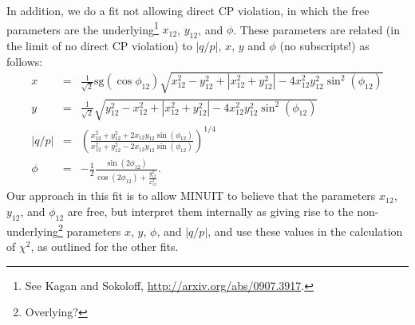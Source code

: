 In addition, we do a fit not allowing direct CP violation, in which the
free parameters are the underlying\footnote{See Kagan and Sokoloff, \url{http://arxiv.org/abs/0907.3917}.}
$x_{12}$, $y_{12}$, and $\phi$. These parameters are related
(in the limit of no direct CP violation) to $|q/p|$, $x$, $y$ and $\phi$ (no subscripts!) as follows:
\begin{eqnarray}
x &=& \frac{1}{\sqrt{2}}\mathrm{sg}(\cos\phi_{12})
\sqrt{x_{12}^2 - y_{12}^2 + |x_{12}^2+y_{12}^2| - 4x_{12}^2y_{12}^2\sin^2(\phi_{12})} \\
%
y &=& \frac{1}{\sqrt{2}}
\sqrt{y_{12}^2 - x_{12}^2 + |x_{12}^2+y_{12}^2| - 4x_{12}^2y_{12}^2\sin^2(\phi_{12})} \\
%
|q/p| &=& \left(\frac{x_{12}^2+y_{12}^2+2x_{12}y_{12}\sin(\phi_{12})}
{x_{12}^2+y_{12}^2-2x_{12}y_{12}\sin(\phi_{12})}\right)^{1/4}\\
%
\phi &=& -\frac{1}{2}\frac{\sin(2\phi_{12})}{\cos(2\phi_{12})+\frac{y_{12}^2}{x_{12}^2}}.
\end{eqnarray}
Our approach in this fit is to allow MINUIT to believe that the parameters $x_{12}$, $y_{12}$,
and $\phi_{12}$ are free, but interpret them internally as giving rise to the 
non-underlying\footnote{Overlying?} parameters $x$, $y$, $\phi$, and $|q/p|$, and use these
values in the calculation of $\chi^2$, as outlined for the other fits. 

